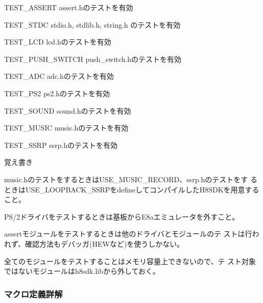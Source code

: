 \begin{DoxyItemize}
\item {\ttfamily T\+E\+S\+T\+\_\+\+A\+S\+S\+E\+R\+T} assert.\+hのテストを有効 \item {\ttfamily T\+E\+S\+T\+\_\+\+S\+T\+D\+C} stdio.\+h, stdlib.\+h, string.\+h のテストを有効 \item {\ttfamily T\+E\+S\+T\+\_\+\+L\+C\+D} lcd.\+hのテストを有効 \item {\ttfamily T\+E\+S\+T\+\_\+\+P\+U\+S\+H\+\_\+\+S\+W\+I\+T\+C\+H} push\+\_\+switch.\+hのテストを有効 \item {\ttfamily T\+E\+S\+T\+\_\+\+A\+D\+C} adc.\+hのテストを有効 \item {\ttfamily T\+E\+S\+T\+\_\+\+P\+S2} ps2.\+hのテストを有効 \item {\ttfamily T\+E\+S\+T\+\_\+\+S\+O\+U\+N\+D} sound.\+hのテストを有効 \item {\ttfamily T\+E\+S\+T\+\_\+\+M\+U\+S\+I\+C} music.\+hのテストを有効 \item {\ttfamily T\+E\+S\+T\+\_\+\+S\+S\+R\+P} ssrp.\+hのテストを有効\end{DoxyItemize}
\begin{DoxyNote}{覚え書き}
\begin{DoxyItemize}
\item music.\+hのテストをするときは\+U\+S\+E\+\_\+\+M\+U\+S\+I\+C\+\_\+\+R\+E\+C\+O\+R\+D、ssrp.\+hのテストをす るときは\+U\+S\+E\+\_\+\+L\+O\+O\+P\+B\+A\+C\+K\+\_\+\+S\+S\+R\+Pをdefineしてコンパイルした\+H8\+S\+D\+Kを用意する こと。 \item P\+S/2ドライバをテストするときは基板から\+E8aエミュレータを外すこと。 \item assertモジュールをテストするときは他のドライバとモジュールのテ ストは行われず、確認方法もデバッガ(H\+E\+Wなど)を使うしかない。 \item 全てのモジュールをテストすることはメモリ容量上できないので、テ スト対象ではないモジュールはh8sdk.\+libから外しておく。\end{DoxyItemize}
 
\end{DoxyNote}


\subsubsection{マクロ定義詳解}
